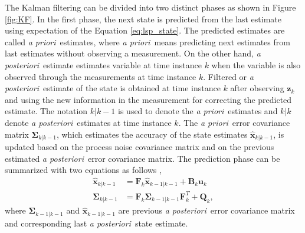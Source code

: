 \documentclass[english, 12pt, a4paper, elec, utf8, a-1b, online]{aaltothesis}
\renewcommand{\vec}[1]{\mathbf{#1}}
\newcommand{\xprior}{\hat{\vec{x}}_{k|k-1}}
\newcommand{\xlast}{\hat{\vec{x}}_{k-1|k-1}}
\newcommand{\priorecov}{\boldsymbol{\Sigma}_{k|k-1}}
\newcommand{\lastecov}{\boldsymbol{\Sigma}_{k-1|k-1}}
\newcommand{\z}{\vec{z}_k}
\newcommand{\stmodel}{\vec{F}_k}
\newcommand{\cimodel}{\vec{B}_k}
\newcommand{\cinput}{\vec{u}_k}
\newcommand{\pcov}{\vec{Q}_k}
\def\prior{\textit{a priori}\ }
\def\post{\textit{a posteriori}\ }
\begin{document}
The Kalman filtering can be divided into two distinct phases as shown in Figure \ref{fig:KF}.
In the first phase, the next state is predicted from the last estimate using expectation of the Equation \eqref{eq:lsp_state}.
The predicted estimates are called \prior estimates, where \prior means predicting next estimates from last estimates without observing a measurement.
On the other hand, \post estimate estimates variable at time instance $k$ when the variable is also observed through the measurements at time instance $k$.
Filtered or \post estimate of the state is obtained at time instance $k$ after observing $\z$ and using the new information in the measurement for correcting the predicted estimate. 
The notation $k|k-1$ is used to denote the \prior estimates and $k|k$ denote \post estimates at time instance $k$.
The \prior error covariance matrix $\priorecov$, which estimates the accuracy of the state estimates $\xprior$, is updated based on the process noise covariance matrix and on the previous estimated \post error covariance matrix.
The prediction phase can be summarized with two equations as follows \cite{Zarchan2000},
\begin{subequations}
\label{eq:kf_predict}
\begin{align}
    \xprior &= \stmodel \xlast + \cimodel \cinput \label{eq:kf_pred_x} \\ 
    \priorecov &= \stmodel \lastecov \stmodel^T + \pcov \label{eq:kf_prior_error_cov},
\end{align}
\end{subequations}
where $\lastecov$ and $\xlast$ are previous \post error covariance matrix and corresponding last \post state estimate.
\end{document}
